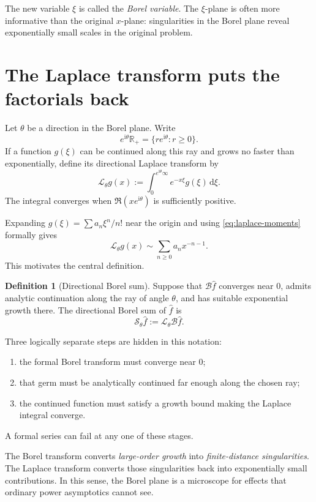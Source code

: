 \documentclass[11pt,openany]{book}
\theoremstyle{definition}
\newtheorem{definition}{Definition}[chapter]
\theoremstyle{plain}
\theoremstyle{remark}
\newcommand{\R}{\mathbb{R}}
\newcommand{\dd}{\,\mathrm{d}}
\newcommand{\ii}{\mathrm{i}}
\newcommand{\asym}{\sim}
\newcommand{\trans}[1]{\widehat{#1}}
\newcommand{\Borel}{\mathcal{B}}
\newcommand{\Laplace}{\mathcal{L}}
\newcommand{\lateralsum}[1]{\mathcal{S}_{#1}}
\begin{document}
The new variable $\xi$ is called the \emph{Borel variable}. The $\xi$-plane is often more informative than the original $x$-plane: singularities in the Borel plane reveal exponentially small scales in the original problem.

\section{The Laplace transform puts the factorials back}

Let $\theta$ be a direction in the Borel plane. Write
\[
 e^{\ii\theta}\R_+=\{re^{\ii\theta}:r\ge0\}.
\]
If a function $g(\xi)$ can be continued along this ray and grows no faster than exponentially, define its directional Laplace transform by
\begin{equation}\label{eq:directional-laplace}
 \Laplace_\theta g(x)
 :=\int_0^{e^{\ii\theta}\infty}e^{-x\xi}g(\xi)\dd\xi.
\end{equation}
The integral converges when $\Re(xe^{\ii\theta})$ is sufficiently positive.

Expanding $g(\xi)=\sum a_n\xi^n/n!$ near the origin and using \eqref{eq:laplace-moments} formally gives
\[
 \Laplace_\theta g(x)
 \asym\sum_{n\ge0}a_nx^{-n-1}.
\]
This motivates the central definition.

\begin{definition}[Directional Borel sum]
Suppose that $\Borel\trans f$ converges near $0$, admits analytic continuation along the ray of angle $\theta$, and has suitable exponential growth there. The directional Borel sum of $\trans f$ is
\begin{equation}\label{eq:borel-sum-definition}
 \lateralsum{\theta}\trans f
 :=\Laplace_\theta\Borel\trans f.
\end{equation}
\end{definition}

Three logically separate steps are hidden in this notation:
\begin{enumerate}
 \item the formal Borel transform must converge near $0$;
 \item that germ must be analytically continued far enough along the chosen ray;
 \item the continued function must satisfy a growth bound making the Laplace integral converge.
\end{enumerate}
A formal series can fail at any one of these stages.

\begin{intuitionbox}
The Borel transform converts \emph{large-order growth} into \emph{finite-distance singularities}. The Laplace transform converts those singularities back into exponentially small contributions. In this sense, the Borel plane is a microscope for effects that ordinary power asymptotics cannot see.
\end{intuitionbox}
\end{document}
